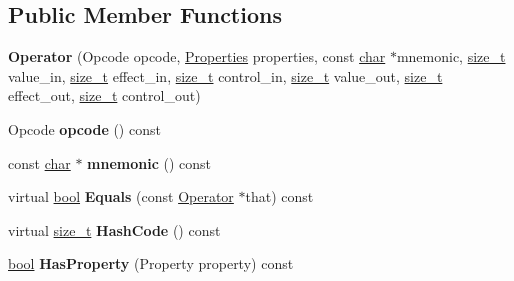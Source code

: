 \subsection*{Public Member Functions}
\begin{DoxyCompactItemize}
\item 
\mbox{\label{classv8_1_1internal_1_1compiler_1_1Operator_acc2f4b9a63bafed89965702360034cef}} 
{\bfseries Operator} (Opcode opcode, \mbox{\hyperlink{classv8_1_1base_1_1Flags}{Properties}} properties, const \mbox{\hyperlink{classchar}{char}} $\ast$mnemonic, \mbox{\hyperlink{classsize__t}{size\+\_\+t}} value\+\_\+in, \mbox{\hyperlink{classsize__t}{size\+\_\+t}} effect\+\_\+in, \mbox{\hyperlink{classsize__t}{size\+\_\+t}} control\+\_\+in, \mbox{\hyperlink{classsize__t}{size\+\_\+t}} value\+\_\+out, \mbox{\hyperlink{classsize__t}{size\+\_\+t}} effect\+\_\+out, \mbox{\hyperlink{classsize__t}{size\+\_\+t}} control\+\_\+out)
\item 
\mbox{\label{classv8_1_1internal_1_1compiler_1_1Operator_a50b37f4734e9a1b22022473d4f9f7229}} 
Opcode {\bfseries opcode} () const
\item 
\mbox{\label{classv8_1_1internal_1_1compiler_1_1Operator_a7bb1933784df2d35611ea6e38d6ade72}} 
const \mbox{\hyperlink{classchar}{char}} $\ast$ {\bfseries mnemonic} () const
\item 
\mbox{\label{classv8_1_1internal_1_1compiler_1_1Operator_afb5391386b536d70443f4d798807e9f0}} 
virtual \mbox{\hyperlink{classbool}{bool}} {\bfseries Equals} (const \mbox{\hyperlink{classv8_1_1internal_1_1compiler_1_1Operator}{Operator}} $\ast$that) const
\item 
\mbox{\label{classv8_1_1internal_1_1compiler_1_1Operator_aea0e9734e0eb05ce9356f5e282b0587f}} 
virtual \mbox{\hyperlink{classsize__t}{size\+\_\+t}} {\bfseries Hash\+Code} () const
\item 
\mbox{\label{classv8_1_1internal_1_1compiler_1_1Operator_a9a1384eccd8559025ddc3e46bc07a26b}} 
\mbox{\hyperlink{classbool}{bool}} {\bfseries Has\+Property} (Property property) const

\end{DoxyCompactItemize}
